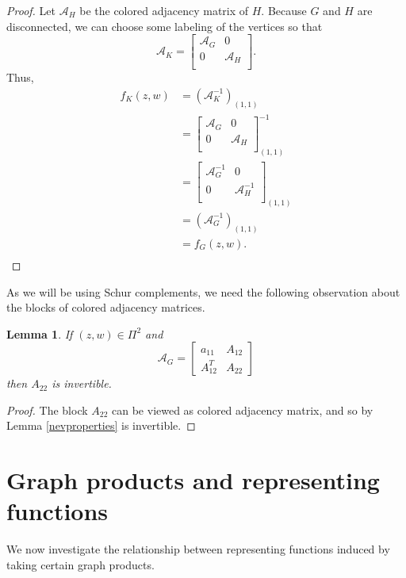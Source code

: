 \documentclass[12pt]{amsart}
\newtheorem{lemma}[theorem]{Lemma}
\theoremstyle{remark}
\newcommand\bbm{\begin{bmatrix}}
\newcommand\ebm{\end{bmatrix}}
\numberwithin{equation}{section}
\newcommand{\cA}{\mathcal{A}}
\begin{document}
\begin{proof}
    Let $\cA_H$ be the colored adjacency matrix of $H$. Because $G$ and $H$ are disconnected, we can choose some labeling of the vertices so that $$\cA_K = \begin{bmatrix}
        \cA_G & 0 \\
        0 & \cA_H \\
    \end{bmatrix}.$$ Thus,
    \begin{align*}
        f_K(z,w) &= (\cA_K^{-1})_{(1,1)} \\
        &= \begin{bmatrix}
        \cA_G & 0 \\
        0 & \cA_H \\
    \end{bmatrix}^{-1}_{(1,1)} \\
    &= \begin{bmatrix}
        \cA_G^{-1} & 0 \\
        0 & \cA_H^{-1} \\
    \end{bmatrix}_{(1,1)} \\
    &= (\cA_G^{-1})_{(1,1)} \\
    &= f_G(z,w). \\
    \end{align*}
\end{proof}

As we will be using Schur complements, we need the following observation about the blocks of colored adjacency matrices. 
\begin{lemma}\label{invertible}
If $(z, w) \in \Pi^2$ and 
\[
\cA_G = \bbm a_{11} & A_{12} \\ A_{12}^T & A_{22} \ebm
\]
then $A_{22}$ is invertible.

\end{lemma}

\begin{proof}
The block $A_{22}$ can be viewed as colored adjacency matrix, and so by Lemma \ref{nevproperties} is invertible.
\end{proof}


\section{Graph products and representing functions}

We now investigate the relationship between representing functions induced by taking certain  graph products. 
\end{document}
